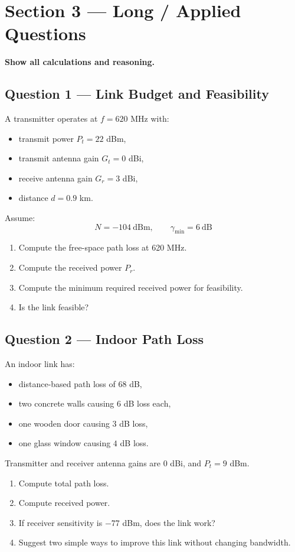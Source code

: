 \documentclass[11pt,a4paper]{article}
\begin{document}
\newpage
\section*{Section 3 --- Long / Applied Questions}
\textbf{Show all calculations and reasoning.}

\subsection*{Question 1 --- Link Budget and Feasibility}
A transmitter operates at $f = 620$ MHz with:
\begin{itemize}[leftmargin=1.2cm]
    \item transmit power $P_t = 22$ dBm,
    \item transmit antenna gain $G_t = 0$ dBi,
    \item receive antenna gain $G_r = 3$ dBi,
    \item distance $d = 0.9$ km.
\end{itemize}

Assume:
\[
N = -104\ \mathrm{dBm}, \qquad \gamma_{\min} = 6\ \mathrm{dB}
\]

\begin{enumerate}[label=\alph*)]
    \item Compute the free-space path loss at 620 MHz.
    \item Compute the received power $P_r$.
    \item Compute the minimum required received power for feasibility.
    \item Is the link feasible?
\end{enumerate}

\subsection*{Question 2 --- Indoor Path Loss}
An indoor link has:
\begin{itemize}[leftmargin=1.2cm]
    \item distance-based path loss of $68$ dB,
    \item two concrete walls causing $6$ dB loss each,
    \item one wooden door causing $3$ dB loss,
    \item one glass window causing $4$ dB loss.
    \end{itemize}

Transmitter and receiver antenna gains are $0$ dBi, and $P_t = 9$ dBm.

\begin{enumerate}[label=\alph*)]
    \item Compute total path loss.
    \item Compute received power.
    \item If receiver sensitivity is $-77$ dBm, does the link work?
    \item Suggest two simple ways to improve this link without changing bandwidth.
\end{enumerate}
\end{document}
